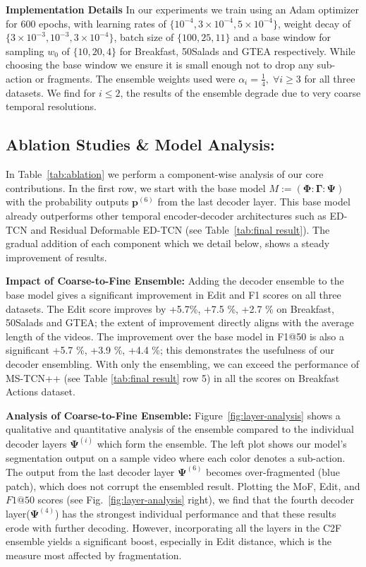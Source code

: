 \documentclass[10pt,twocolumn,letterpaper]{article}
\newcommand{\bp}{\mathbf{p}}
\newcommand{\enc}{\ensuremath{\mathbf{\Phi}}}
\newcommand{\dec}{\ensuremath{\mathbf{\Psi}}}
\newcommand{\bottle}{\ensuremath{\mathbf{\Gamma}}}
\begin{document}
\textbf{Implementation Details} In our experiments we train using an Adam optimizer for $600$ epochs, with learning rates of $\{10^{-4}, 3\!\times\! 10^{-4}, 5\!\times\!10^{-4}\}$, weight decay of $\{3\times10^{-3}, 10^{-3}, 3\times10^{-4}\}$, batch size of $\{100, 25, 11\}$ and a base window for sampling $w_0$ of $\{10, 20, 4\}$ for Breakfast, 50Salads and GTEA respectively. While choosing the base window we ensure it is small enough not to drop any sub-action or fragments. The ensemble weights used were $\alpha_i=\frac{1}{4} ,\;\forall i\!\geq\!3$ for all three datasets. We find for $i\!\le\!2$, the results of the ensemble degrade due to very coarse temporal resolutions.

\subsection{Ablation Studies \& Model Analysis:} 

In Table~\ref{tab:ablation} we perform a component-wise analysis of our core contributions.  In the first row, we start with the base model $M\!:=\! (\enc\!:\!\bottle\!:\!\dec)$ with the probability outputs $\bp^{(6)}$ from the last decoder layer.  This base model already outperforms other temporal encoder-decoder architectures such as ED-TCN \cite{TED-lea2017temporal} and Residual Deformable ED-TCN \cite{TEDresi-lei2018temporal} (see Table~\ref{tab:final result}).  The gradual addition of each component which we detail below, shows a steady improvement of results. 
 

\textbf{Impact of Coarse-to-Fine Ensemble:} Adding the decoder ensemble to the base model gives a significant improvement in Edit and F1 scores on all three datasets. The Edit score improves by +5.7\%, +7.5 \%, +2.7 \% on Breakfast, 50Salads and GTEA; the extent of improvement directly aligns with the average length of the videos. The improvement over the base model in F1@50 is also a significant +5.7 \%, +3.9 \%, +4.4 \%; this demonstrates the usefulness of our decoder ensembling. With only the ensembling, we can exceed the performance of MS-TCN++ (see Table \ref{tab:final result} row 5) in all the scores on Breakfast Actions dataset. 


\textbf{Analysis of Coarse-to-Fine Ensemble:} 
Figure~\ref{fig:layer-analysis} shows a qualitative and quantitative analysis of the ensemble compared to the individual decoder layers $\dec^{(i)}$ which form the ensemble. The left plot shows our model's segmentation output on a sample video where each color denotes a sub-action. The output from the last decoder layer $\dec^{(6)}$ becomes over-fragmented (blue patch), which does not corrupt the ensembled result. Plotting the MoF, Edit, and $F1@50$ scores (see Fig.~\ref{fig:layer-analysis} right), we find that the fourth decoder layer($\dec^{(4)}$) has the strongest individual performance and that these results erode with further decoding.  However, incorporating all the layers in the C2F ensemble yields a significant boost, especially in Edit distance, which is the measure most affected by fragmentation.
\end{document}
